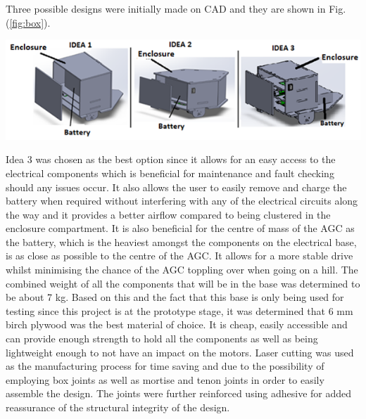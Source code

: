 \documentclass[11pt,landscape]{article}
\newenvironment{Figure}
  {\par\medskip\noindent\minipage{\linewidth}}
  {\endminipage\par\medskip}
\begin{document}
\begin{multicols}{2}
    Three possible designs were initially made on CAD and they are shown in
    Fig. (\ref{fig:box}).
    
    \begin{Figure}
        \begin{center}
            \includegraphics[width=1.0\textwidth]{Figure23.png}
            \label{fig:box}
        \end{center}
    \end{Figure}
    
    
    Idea 3 was chosen as the best option since it allows for an easy access to
    the electrical components which is beneficial for maintenance and fault
    checking should any issues occur. It also allows the user to easily remove
    and charge the battery when required without interfering with any of the
    electrical circuits along the way and it provides a better airflow compared
    to being clustered in the enclosure compartment. It is also beneficial for the
    centre of mass of the AGC as the battery, which is the heaviest amongst
    the components on the electrical base, is as close as possible to the centre
    of the AGC. It allows for a more stable drive whilst minimising the chance
    of the AGC toppling over when going on a hill. The combined weight of all
    the components that will be in the base was determined to be about 7 kg.
    Based on this and the fact that this base is only being used for testing
    since this project is at the prototype stage, it was determined that 6 mm
    birch plywood was the best material of choice. It is cheap, easily
    accessible and can provide enough strength to hold all the components as
    well as being lightweight enough to not have an impact on the motors. Laser
    cutting was used as the manufacturing process for time saving and due to the
    possibility of employing box joints as well as mortise and tenon joints in
    order to easily assemble the design. The joints were further reinforced
    using adhesive for added reassurance of the structural integrity of
    the design.
    

\end{multicols}
\end{document}
